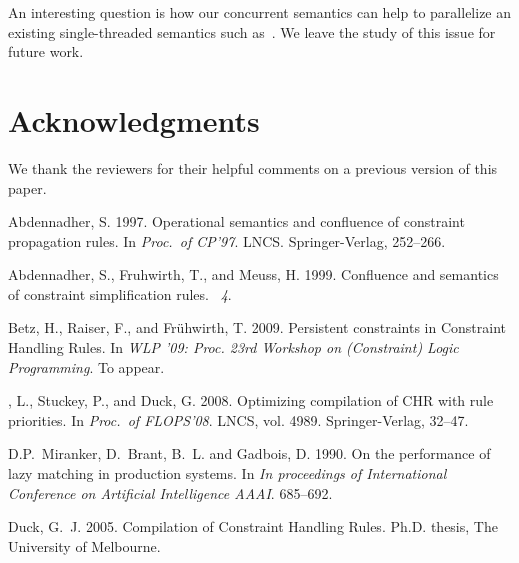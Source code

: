 \documentclass{tlp}
\begin{document}
An interesting question is how our concurrent semantics can help to
parallelize an existing single-threaded semantics such as~\cite{DuckSBH04}.
We leave the study of this issue for future work.

\section*{Acknowledgments}

We thank the reviewers for their helpful comments
on a previous version of this paper.

\begin{thebibliography}{}

{\sc Abdennadher, S.} 1997.
\newblock Operational semantics and confluence of constraint propagation rules.
\newblock In {\em Proc.\ of CP'97}. LNCS. Springer-Verlag, 252--266.

{\sc Abdennadher, S.}, {\sc Fruhwirth, T.}, {\sc and} {\sc Meuss, H.} 1999.
\newblock Confluence and semantics of constraint simplification rules.
~{\em 4}.

{\sc Betz, H.}, {\sc Raiser, F.}, {\sc and} {\sc Fr{\"u}hwirth, T.} 2009.
\newblock Persistent constraints in {C}onstraint {H}andling {R}ules.
\newblock In {\em WLP '09: Proc. 23rd Workshop on (Constraint) Logic
  Programming}.
\newblock To appear.

{, L.}, {\sc Stuckey, P.}, {\sc and} {\sc Duck, G.} 2008.
\newblock Optimizing compilation of {CHR} with rule priorities.
\newblock In {\em Proc.\ of FLOPS'08}. LNCS, vol. 4989. Springer-Verlag,
  32--47.

{\sc D.P.~Miranker, D.~Brant, B.~L.} {\sc and} {\sc Gadbois, D.} 1990.
\newblock On the performance of lazy matching in production systems.
\newblock In {\em In proceedings of International Conference on Artificial
  Intelligence AAAI}. 685--692.

{\sc Duck, G.~J.} 2005.
\newblock Compilation of {Constraint Handling Rules}.
\newblock Ph.D. thesis, The University of Melbourne.


\end{thebibliography}
\end{document}
